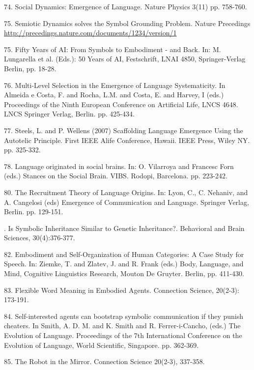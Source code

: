 74. \citet{Loreto:07a} Social Dynamics: Emergence of Language. Nature Physics 3(11) pp. 758-760. 

75. \citet{Steels:07b} Semiotic Dynamics solves the Symbol Grounding Problem. Nature Precedings 
\url{http://precedings.nature.com/documents/1234/version/1}

75. \citet{Steels:07c} Fifty Years of AI: From Symbols to Embodiment - and Back.  In: M. Lungarella et al. (Eds.): 50 Years of AI, Festschrift, LNAI 4850, Springer-Verlag Berlin, pp. 18-28. 

76. \citet{vantrijp:07d} Multi-Level Selection in the Emergence of Language Systematicity. In Almeida e Costa, F. and Rocha, L.M. and Costa, E. and Harvey, I (eds.) Proceedings of the Ninth European Conference on Artificial Life, LNCS 4648.
LNCS Springer Verlag, Berlin. pp. 425-434. 

77. \citet{Steels:07e} Steels, L. and P. Wellens (2007) Scaffolding Language Emergence Using the Autotelic Principle. 
First IEEE Alife Conference, Hawaii. IEEE Press, Wiley NY. pp. 325-332. 

78. \citet{Steels:07f} Language originated in social brains. In: O. Vilarroya and Francesc Forn (eds.) Stances on the Social Brain. VIBS. Rodopi, Barcelona. pp. 223-242. 

80. \citet{Steels:07g} The Recruitment Theory of Language Origins. In: Lyon, C., C. Nehaniv, and A. Cangelosi (eds) Emergence of Communication and Language. Springer Verlag, Berlin. pp. 129-151. 

. \citet{Steels:07h} Is Symbolic Inheritance Similar to Genetic Inheritance?. Behavioral and Brain Sciences, 30(4):376-377.

82. \citet{Steels:07i} Embodiment and Self-Organization of Human Categories: A Case Study for Speech. In: Ziemke, T. and Zlatev, J. and R. Frank (eds.) Body, Language, and Mind, Cognitive Linguistics Research, Mouton De Gruyter. Berlin, pp. 411-430. 

83. \citet{Wellens:08a} Flexible Word Meaning in Embodied Agents. Connection Science, 20(2-3): 173-191. 

84. \citet{Wang:08b} Self-interested agents can bootstrap symbolic communication if they punish cheaters. In Smith, A. D. M. and K. Smith and R. Ferrer-i-Cancho, (eds.) The Evolution of Language. Proceedings of the 7th International Conference on the Evolution of Language, World Scientific, Singapore. pp. 362-369. 

85. \citet{Steels:08c} The Robot in the Mirror. Connection Science 20(2-3), 337-358. 

